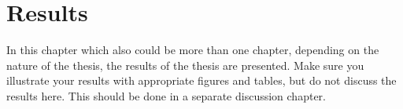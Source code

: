 
\chapter{Results}
  \label{sec:res}

In this chapter which also could be more than one chapter, depending on the nature of the thesis, the results of the thesis are presented.
Make sure you illustrate your results with appropriate figures and tables, but do not discuss the results here. This should be done in a separate discussion chapter.


\clearpage
